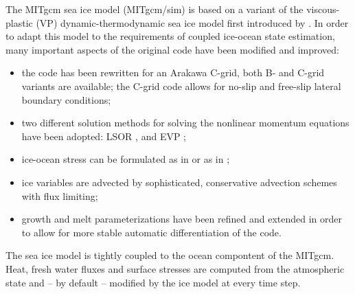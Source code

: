 
The MITgcm sea ice model (MITgcm/sim) is based on a variant of the
viscous-plastic (VP) dynamic-thermodynamic sea ice model \citep{zhang97}
first introduced by \citet{hib79, hib80}. In order to adapt this model
to the requirements of coupled ice-ocean state estimation, many
important aspects of the original code have been modified and
improved:
\begin{itemize}
\item the code has been rewritten for an Arakawa C-grid, both B- and
  C-grid variants are available; the C-grid code allows for no-slip
  and free-slip lateral boundary conditions;
\item two different solution methods for solving the nonlinear
  momentum equations have been adopted: LSOR \citep{zhang97}, and EVP
  \citep{hun97};
\item ice-ocean stress can be formulated as in \citet{hibler87} or as in
  \citet{cam08}; 
\item ice variables are advected by sophisticated, conservative
  advection schemes with flux limiting;
\item growth and melt parameterizations have been refined and extended
  in order to allow for more stable automatic differentiation of the code.
\end{itemize}
The sea ice model is tightly coupled to the ocean compontent of the
MITgcm.  Heat, fresh water fluxes and surface stresses are computed
from the atmospheric state and -- by default -- modified by the ice
model at every time step.

